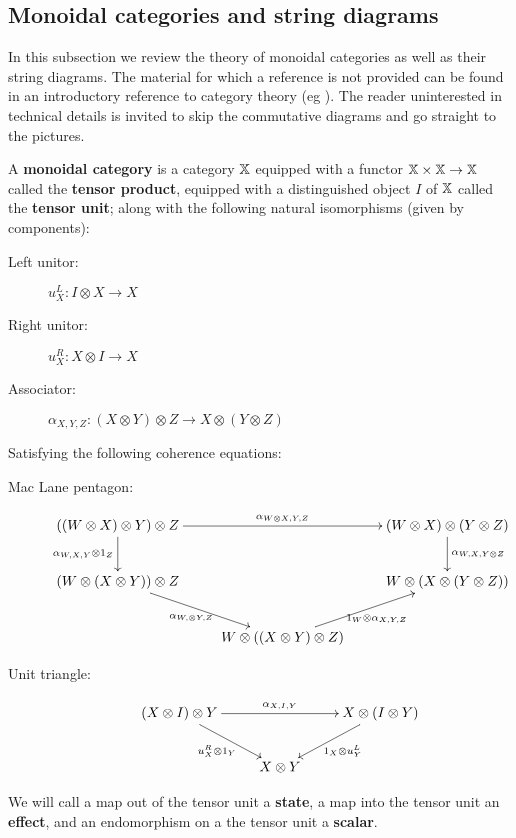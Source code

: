 
\subsection{Monoidal categories and string diagrams}
\label{subsec:moncat}

In this subsection we review the theory of monoidal categories as well as their string diagrams.   The material for which a reference is not provided can be found in an introductory reference to category theory (eg  \cite{maclane}).  The reader uninterested in technical details is invited to skip the commutative diagrams and go straight to the pictures.

\begin{definition}
A {\bf monoidal category} is a category $\mathbb{X}$ equipped with a functor $\mathbb{X}\times\mathbb{X}\to \mathbb{X}$ called the {\bf tensor product}, equipped with a distinguished object $I$ of $\mathbb{X}$ called the {\bf tensor unit}; along with the following natural isomorphisms (given by components):

\begin{description}
\item[Left unitor:]
\hfil$
u_X^L:I\otimes X \to X
$
\item[Right unitor:]
\hfil$
u_X^R: X\otimes I \to X
$
\item[Associator:]
\hfil$
\alpha_{X,Y,Z}:(X\otimes Y)\otimes Z \to X\otimes(Y\otimes Z)
$
\end{description}

Satisfying the following coherence equations:

\begin{description}
\item[Mac Lane pentagon:]
$$
\xymatrix{
  ((W\otimes X )\otimes Y)\otimes Z \ar[rr]^{\alpha_{W\otimes X,Y,Z}} \ar[d]_{\alpha_{W,X,Y}\otimes 1_Z}
    &
    & (W\otimes X )\otimes (Y\otimes Z) \ar[d]^{\alpha_{W, X,Y\otimes Z}}
  \\  (W\otimes(X\otimes Y))\otimes Z \ar[dr]_{\alpha_{W,\otimes Y,Z}}
    & 
    & W\otimes (X\otimes(Y\otimes Z)) 
  \\&
    W\otimes ((X\otimes Y)\otimes Z) \ar[ur]_{1_W\otimes \alpha_{X,Y,Z}}
}
$$
\item[Unit triangle:]
$$
\xymatrix{
  (X\otimes I)\otimes Y \ar[rr]^{\alpha_{X,I,Y}} \ar[dr]_{u_X^{R}\otimes 1_Y}
    &
    & X\otimes (I\otimes Y) \ar[dl]^{1_X\otimes u_Y^{L}}\\
  & X\otimes Y
}
$$
\end{description}
We will call a map out of the tensor unit a {\bf state}, a map into the tensor unit an {\bf effect}, and an endomorphism on a the tensor unit a {\bf scalar}.
\end{definition}

